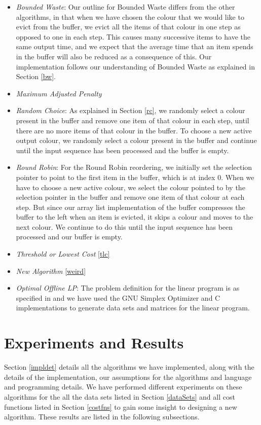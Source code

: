 \begin{itemize}
\item \textit{Bounded Waste}: Our outline for Bounded Waste differs from the other algorithms, in that when we have chosen the colour that we would like to evict from the buffer, we evict all the items of that colour in one step as opposed to one in each step. This causes many successive items to have the same output time, and we expect that the average time that an item spends in the buffer will also be reduced as a consequence of this. Our implementation follows our understanding of Bounded Waste as explained in Section \ref{bw}. 
\item \textit{Maximum Adjusted Penalty}
\item \textit{Random Choice}: As explained in Section \ref{rc}, we randomly select a colour present in the buffer and remove one item of that colour in each step, until there are no more items of that colour in the buffer. To choose a new active output colour, we randomly select a colour present in the buffer and continue until the input sequence has been processed and the buffer is empty. 
\item \textit{Round Robin}: For the Round Robin reordering, we initially set the selection pointer to point to the first item in the buffer, which is at index 0. When we have to choose a new active colour, we select the colour pointed to by the selection pointer in the buffer and remove one item of that colour at each step. But since our array list implementation of the buffer compresses the buffer to the left when an item is evicted, it skips a colour and moves to the next colour. We continue to do this until the input sequence has been processed and our buffer is empty.
\item \textit{Threshold or Lowest Cost} \ref{tlc}
\item \textit{New Algorithm} \ref{weird}
\item \textit{Optimal Offline LP}: The problem definition for the linear program is as specified in \cite{adamaszek2012optimal} and we have used the GNU Simplex Optimizer and C implementations to generate data sets and matrices for the linear program. 
\end{itemize}


\section{Experiments and Results} \label{experiments}
Section \ref{impldet} details all the algorithms we have implemented, along with the details of the implementation, our assumptions for the algorithms and language and programming details. We have performed different experiments on these algorithms for the all the data sets listed in Section \ref{dataSets} and all cost functions listed in Section \ref{costfns} to gain some insight to designing a new algorithm. These results are listed in the following subsections. 

